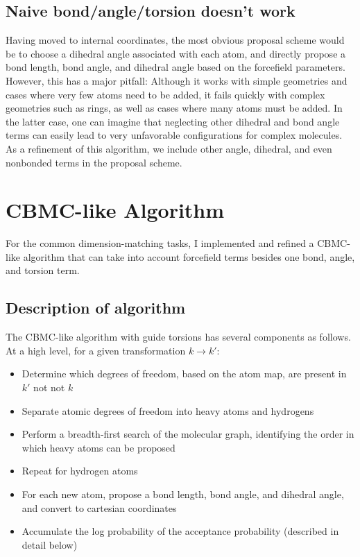 \subsection{Naive bond/angle/torsion doesn’t work}
%
Having moved to internal coordinates, the most obvious proposal scheme would be to choose a dihedral angle associated with each atom, and directly propose a bond length, bond angle, and dihedral angle based on the forcefield parameters.
%
However, this has a major pitfall: Although it works with simple geometries and cases where very few atoms need to be added, it fails quickly with complex geometries such as rings, as well as cases where many atoms must be added.
%
In the latter case, one can imagine that neglecting other dihedral and bond angle terms can easily lead to very unfavorable configurations for complex molecules.
%
As a refinement of this algorithm, we include other angle, dihedral, and even nonbonded terms in the proposal scheme.
%
\section{CBMC-like Algorithm}
%
For the common dimension-matching tasks, I implemented and refined a CBMC-like \cite{Siepmann1992, Andrieu2010pmcmc, COMBE2003} algorithm that can take into account forcefield terms besides one bond, angle, and torsion term. 
%
\subsection{Description of algorithm}
The CBMC-like algorithm with guide torsions has several components as follows.
%
At a high level, for a given transformation $k \longrightarrow k'$:
%
\begin{itemize}
    \item Determine which degrees of freedom, based on the atom map, are present in $k'$ not not $k$
    \item Separate atomic degrees of freedom into heavy atoms and hydrogens
    \item Perform a breadth-first search of the molecular graph, identifying the order in which heavy atoms can be proposed
    \item Repeat for hydrogen atoms
    \item For each new atom, propose a bond length, bond angle, and dihedral angle, and convert to cartesian coordinates
    \item Accumulate the log probability of the acceptance probability (described in detail below)
\end{itemize}
%
